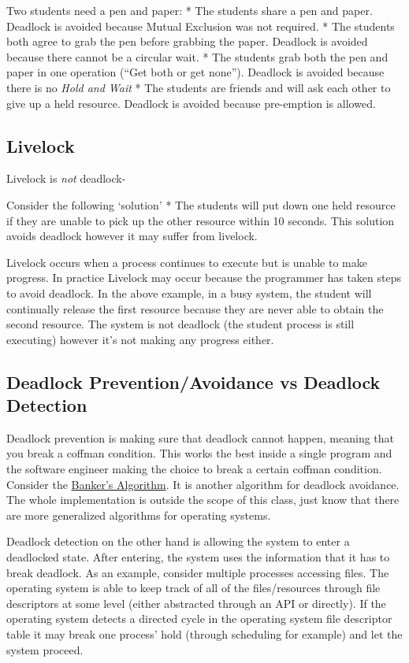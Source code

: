 Two students need a pen and paper: * The students share a pen and paper.
Deadlock is avoided because Mutual Exclusion was not required. * The
students both agree to grab the pen before grabbing the paper. Deadlock
is avoided because there cannot be a circular wait. * The students grab
both the pen and paper in one operation (``Get both or get none'').
Deadlock is avoided because there is no \emph{Hold and Wait} * The
students are friends and will ask each other to give up a held resource.
Deadlock is avoided because pre-emption is allowed.

\subsection{Livelock}\label{livelock}

Livelock is \emph{not} deadlock-

Consider the following `solution' * The students will put down one held
resource if they are unable to pick up the other resource within 10
seconds. This solution avoids deadlock however it may suffer from
livelock.

Livelock occurs when a process continues to execute but is unable to
make progress. In practice Livelock may occur because the programmer has
taken steps to avoid deadlock. In the above example, in a busy system,
the student will continually release the first resource because they are
never able to obtain the second resource. The system is not deadlock
(the student process is still executing) however it's not making any
progress either.

\subsection{Deadlock Prevention/Avoidance vs Deadlock
Detection}\label{deadlock-preventionavoidance-vs-deadlock-detection}

Deadlock prevention is making sure that deadlock cannot happen, meaning
that you break a coffman condition. This works the best inside a single
program and the software engineer making the choice to break a certain
coffman condition. Consider the
\href{https://en.wikipedia.org/wiki/Banker's_algorithm}{Banker's
Algorithm}. It is another algorithm for deadlock avoidance. The whole
implementation is outside the scope of this class, just know that there
are more generalized algorithms for operating systems.

Deadlock detection on the other hand is allowing the system to enter a
deadlocked state. After entering, the system uses the information that
it has to break deadlock. As an example, consider multiple processes
accessing files. The operating system is able to keep track of all of
the files/resources through file descriptors at some level (either
abstracted through an API or directly). If the operating system detects
a directed cycle in the operating system file descriptor table it may
break one process' hold (through scheduling for example) and let the
system proceed.


